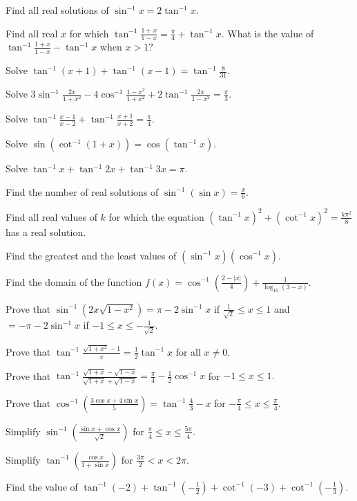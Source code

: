 \item Find all real solutions of $\sin^{-1}x = 2\tan^{-1}x.$
\item Find all real $x$ for which $\tan^{-1}\frac{1 + x}{1 - x} = \frac{\pi}{4} + \tan^{-1}x.$ What is the value of
  $\tan^{-1}\frac{1 + x}{1 - x} - \tan^{-1}x$ when $x > 1?$
\item Solve $\tan^{-1}(x + 1) + \tan^{-1}(x - 1) = \tan^{-1}\frac{8}{31}.$
\item Solve $3\sin^{-1}\frac{2x}{1 + x^2} - 4\cos^{-1}\frac{1 - x^2}{1 + x^2} + 2\tan^{-1}\frac{2x}{1 - x^2} =
  \frac{\pi}{3}.$
\item Solve $\tan^{-1}\frac{x - 1}{x - 2} + \tan^{-1}\frac{x + 1}{x + 2} = \frac{\pi}{4}.$
\item Solve $\sin\left(\cot^{-1}(1 + x)\right) = \cos\left(\tan^{-1}x\right).$
\item Solve $\tan^{-1}x + \tan^{-1}2x + \tan^{-1}3x = \pi.$
\item Find the number of real solutions of $\sin^{-1}(\sin x) = \frac{x}{6}.$
\item Find all real values of $k$ for which the equation $(\tan^{-1}x)^2 + (\cot^{-1}x)^2 = \frac{k\pi^2}{8}$ has a real
  solution.
\item Find the greatest and the least values of $(\sin^{-1}x)(\cos^{-1}x).$
\item Find the domain of the function $f(x) = \cos^{-1}\left(\frac{2 - |x|}{4}\right) + \frac{1}{\log_{10}(3 - x)}.$
\item Prove that $\sin^{-1}\left(2x\sqrt{1 - x^2}\right) = \pi - 2\sin^{-1}x$ if $\frac{1}{\sqrt{2}}\leq x\leq 1$ and
  $= -\pi - 2\sin^{-1}x$ if $-1\leq x\leq -\frac{1}{\sqrt{2}}.$
\item Prove that $\tan^{-1}\frac{\sqrt{1 + x^2} - 1}{x} = \frac{1}{2}\tan^{-1}x$ for all $x\neq 0.$
\item Prove that $\tan^{-1}\frac{\sqrt{1 + x} - \sqrt{1 - x}}{\sqrt{1 + x} + \sqrt{1 - x}} = \frac{\pi}{4} -
  \frac{1}{2}\cos^{-1}x$ for $-1\leq x\leq 1.$
\item Prove that $\cos^{-1}\left(\frac{3\cos x + 4\sin x}{5}\right) = \tan^{-1}\frac{4}{3} - x$ for $-\frac{\pi}{4}\leq
  x\leq \frac{\pi}{4}.$
\item Simplify $\sin^{-1}\left(\frac{\sin x + \cos x}{\sqrt{2}}\right)$ for $\frac{\pi}{4}\leq x\leq \frac{5\pi}{4}.$
\item Simplify $\tan^{-1}\left(\frac{\cos x}{1 + \sin x}\right)$ for $\frac{3\pi}{2} < x < 2\pi.$
\item Find the value of $\tan^{-1}(-2) + \tan^{-1}\left(-\frac{1}{2}\right) + \cot^{-1}(-3) + \cot^{-1}\left(-\frac{1}{3}\right).$
